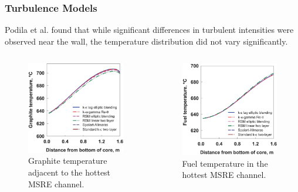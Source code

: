 \begin{frame}
  \frametitle{Turbulence Models}
  Podila et al. \cite{podila_cfd_2019} found that while significant differences in turbulent
  intensities were observed near the wall, the temperature distribution did not vary significantly.
  \begin{columns}
    \column[t]{5.5cm}
  \begin{figure}
    \centering
    \includegraphics[width=.8\columnwidth]{images/podila-graphite}
    \caption{Graphite temperature adjacent to the hottest MSRE channel.}
  \end{figure}
  \column[t]{5.5cm}
  \begin{figure}
    \centering
    \includegraphics[width=.8\columnwidth]{images/podila-fuel}
    \caption{Fuel temperature in the hottest MSRE channel.}
  \end{figure}
\end{columns}
\end{frame}
